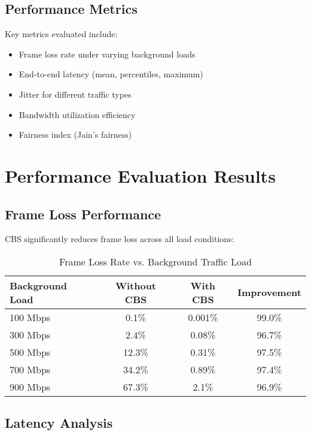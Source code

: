 \documentclass[10pt, journal, compsoc]{IEEEtran}
\begin{document}
\subsection{Performance Metrics}

Key metrics evaluated include:

\begin{itemize}
    \item Frame loss rate under varying background loads
    \item End-to-end latency (mean, percentiles, maximum)
    \item Jitter for different traffic types
    \item Bandwidth utilization efficiency
    \item Fairness index (Jain's fairness)
\end{itemize}

\section{Performance Evaluation Results}

\subsection{Frame Loss Performance}

CBS significantly reduces frame loss across all load conditions:

\begin{table}[H]
\centering
\caption{Frame Loss Rate vs. Background Traffic Load}
\begin{tabular}{|l|c|c|c|}
\hline
\textbf{Background Load} & \textbf{Without CBS} & \textbf{With CBS} & \textbf{Improvement} \\
\hline
100 Mbps & 0.1\% & 0.001\% & 99.0\% \\
300 Mbps & 2.4\% & 0.08\% & 96.7\% \\
500 Mbps & 12.3\% & 0.31\% & 97.5\% \\
700 Mbps & 34.2\% & 0.89\% & 97.4\% \\
900 Mbps & 67.3\% & 2.1\% & 96.9\% \\
\hline
\end{tabular}
\end{table}

\subsection{Latency Analysis}
\end{document}
